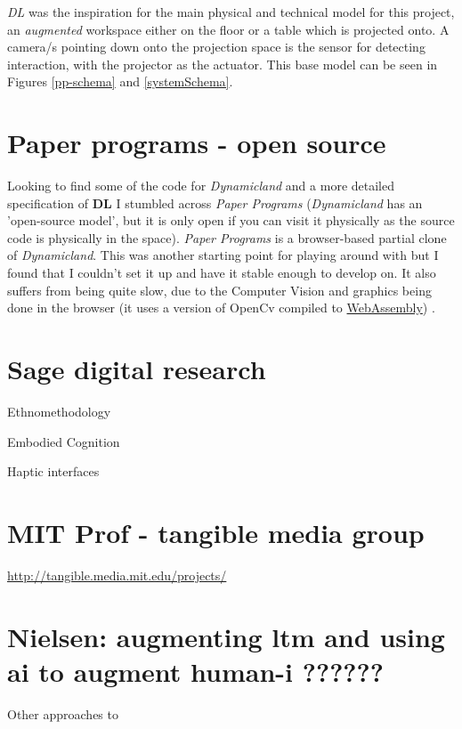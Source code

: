 \documentclass[12pt]{report}
\begin{document}
\emph{DL} was the inspiration for the main physical and technical model for
this project, an \emph{augmented} workspace either on the floor or a table which is
projected onto. A camera/s pointing down onto the projection space is the sensor
for detecting interaction, with the projector as the actuator. This base model can be
seen in Figures \ref{pp-schema} and  \ref{systemSchema}.

\section{Paper programs - open source}
\label{sec:org9cdd54c}

Looking to find some of the code for \emph{Dynamicland} and a more detailed
specification of \textbf{DL} I stumbled across \emph{Paper Programs} (\emph{Dynamicland} has an
'open-source model', but it is only open if you can visit it physically as the
source code is physically in the space). \emph{Paper Programs} is a browser-based
partial clone of \emph{Dynamicland}. This was another starting point for playing
around with but I found that I couldn't set it up and have it stable enough to
develop on. It also suffers from being quite slow, due to the Computer Vision
and graphics being done in the browser (it uses a version of OpenCv compiled to
\href{https://webassembly.org/}{WebAssembly}) \cite{JpPaperPrograms}.


\section{Sage digital research}
\label{sec:org39d8518}

Ethnomethodology

Embodied Cognition

Haptic interfaces

\section{MIT Prof - tangible media group}
\label{sec:orgb9d195f}
\url{http://tangible.media.mit.edu/projects/}
\section{Nielsen: augmenting ltm and using ai to augment human-i ??????}
\label{sec:orgb38571f}

Other approaches to 

\cite{NielsenMich2018altm}

\cite{carter2017using}  
\end{document}
